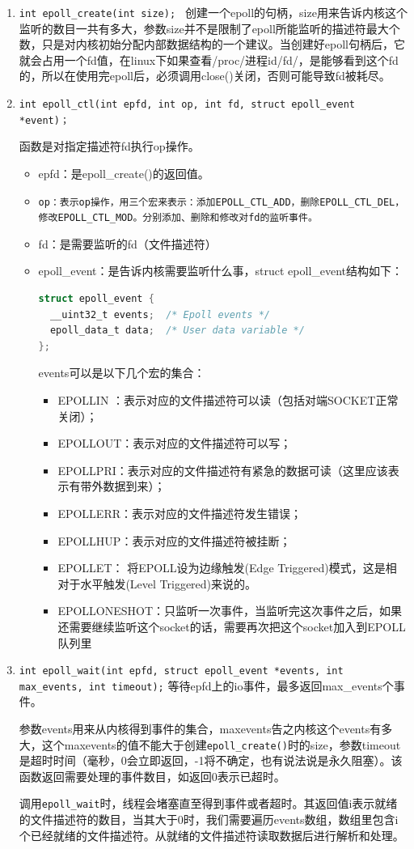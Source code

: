 \documentclass[format=final, language=chinese, degree=fyp]{hustthesis}
\begin{document}
\begin{enumerate}
	\item \lstinline {int epoll_create(int size); }
创建一个epoll的句柄，size用来告诉内核这个监听的数目一共有多大，参数size并不是限制了epoll所能监听的描述符最大个数，只是对内核初始分配内部数据结构的一个建议。当创建好epoll句柄后，它就会占用一个fd值，在linux下如果查看/proc/进程id/fd/，是能够看到这个fd的，所以在使用完epoll后，必须调用close()关闭，否则可能导致fd被耗尽。

	\item \lstinline {int epoll_ctl(int epfd, int op, int fd, struct epoll_event *event)；}

函数是对指定描述符fd执行op操作。
	\begin{itemize}
		\item epfd：是epoll\_create()的返回值。\label{item:2}
		\item \verb|op：表示op操作，用三个宏来表示：添加EPOLL_CTL_ADD，删除EPOLL_CTL_DEL，修改EPOLL_CTL_MOD。分别添加、删除和修改对fd的监听事件。|
		\item fd：是需要监听的fd（文件描述符）
		\item epoll\_event：是告诉内核需要监听什么事，struct epoll\_event结构如下：
		\begin{lstlisting}[language=c]
struct epoll_event {
  __uint32_t events;  /* Epoll events */
  epoll_data_t data;  /* User data variable */
};
		\end{lstlisting}
	events可以是以下几个宏的集合：
		\begin{itemize}
			\item EPOLLIN ：表示对应的文件描述符可以读（包括对端SOCKET正常关闭）；\label{item:3}
			\item EPOLLOUT：表示对应的文件描述符可以写；
			\item EPOLLPRI：表示对应的文件描述符有紧急的数据可读（这里应该表示有带外数据到来）；
			\item EPOLLERR：表示对应的文件描述符发生错误；
			\item EPOLLHUP：表示对应的文件描述符被挂断；
			\item EPOLLET： 将EPOLL设为边缘触发(Edge Triggered)模式，这是相对于水平触发(Level Triggered)来说的。
			\item EPOLLONESHOT：只监听一次事件，当监听完这次事件之后，如果还需要继续监听这个socket的话，需要再次把这个socket加入到EPOLL队列里
		\end{itemize}
	\end{itemize}
	\item \lstinline {int epoll_wait(int epfd, struct epoll_event *events, int max_events, int timeout);}
等待epfd上的io事件，最多返回max\_events个事件。

参数events用来从内核得到事件的集合，maxevents告之内核这个events有多大，这个maxevents的值不能大于创建\verb|epoll_create()|时的size，参数timeout是超时时间（毫秒，0会立即返回，-1将不确定，也有说法说是永久阻塞）。该函数返回需要处理的事件数目，如返回0表示已超时。

调用\verb|epoll_wait|时，线程会堵塞直至得到事件或者超时。其返回值i表示就绪的文件描述符的数目，当其大于0时，我们需要遍历events数组，数组里包含i个已经就绪的文件描述符。从就绪的文件描述符读取数据后进行解析和处理。
\end{enumerate}
\end{document}
